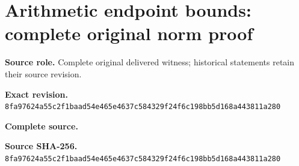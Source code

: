 \begingroup
\sloppy
\small
\clearpage
\section{Arithmetic endpoint bounds: complete original norm proof}
\noindent\textbf{Source role.} Complete original delivered witness; historical statements retain their source revision.\par
\noindent\textbf{Exact revision.} \nolinkurl{8fa97624a55c2f1baad54e465e4637c584329f24f6c198bb5d168a443811a280}\par
\noindent\textbf{Complete source.} \par
\noindent\textbf{Source SHA-256.} \nolinkurl{8fa97624a55c2f1baad54e465e4637c584329f24f6c198bb5d168a443811a280}\par\medskip

\endgroup
